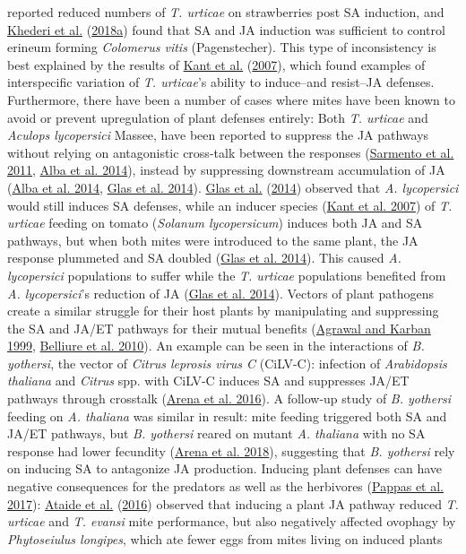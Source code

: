 \documentclass[12pt,final,CPage]{ufthesis}
\begin{document}
{reported reduced numbers of \emph{T. urticae} on strawberries post SA induction, and \protect\hyperlink{ref-Khederi2018}{Khederi et al.} (\protect\hyperlink{ref-Khederi2018}{2018a}) found that SA and JA induction was sufficient to control erineum forming \emph{Colomerus vitis} (Pagenstecher). This type of inconsistency is best explained by the results of \protect\hyperlink{ref-Kant2007}{Kant et al.} (\protect\hyperlink{ref-Kant2007}{2007}), which found examples of interspecific variation of \emph{T. urticae}'s ability to induce--and resist--JA defenses. Furthermore, there have been a number of cases where mites have been known to avoid or prevent upregulation of plant defenses entirely: Both \emph{T. urticae} and \emph{Aculops lycopersici} Massee, have been reported to suppress the JA pathways without relying on antagonistic cross-talk between the responses (\protect\hyperlink{ref-Sarmento2011}{Sarmento et al. 2011}, \protect\hyperlink{ref-Alba2014}{Alba et al. 2014}), instead by suppressing downstream accumulation of JA (\protect\hyperlink{ref-Alba2014}{Alba et al. 2014}, \protect\hyperlink{ref-Glas2014}{Glas et al. 2014}). \protect\hyperlink{ref-Glas2014}{Glas et al.} (\protect\hyperlink{ref-Glas2014}{2014}) observed that \emph{A. lycopersici} would still induces SA defenses, while an inducer species (\protect\hyperlink{ref-Kant2007}{Kant et al. 2007}) of \emph{T. urticae} feeding on tomato (\emph{Solanum lycopersicum}) induces both JA and SA pathways, but when both mites were introduced to the same plant, the JA response plummeted and SA doubled (\protect\hyperlink{ref-Glas2014}{Glas et al. 2014}). This caused \emph{A. lycopersici} populations to suffer while the \emph{T. urticae} populations benefited from \emph{A. lycopersici}'s reduction of JA (\protect\hyperlink{ref-Glas2014}{Glas et al. 2014}). Vectors of plant pathogens create a similar struggle for their host plants by manipulating and suppressing the SA and JA/ET pathways for their mutual benefits (\protect\hyperlink{ref-Agrawal1999}{Agrawal and Karban 1999}, \protect\hyperlink{ref-Belliure2010}{Belliure et al. 2010}). An example can be seen in the interactions of \emph{B. yothersi}, the vector of \emph{Citrus leprosis virus C} (CiLV-C): infection of \emph{Arabidopsis thaliana} and \emph{Citrus} spp. with CiLV-C induces SA and suppresses JA/ET pathways through crosstalk (\protect\hyperlink{ref-Arena2016}{Arena et al. 2016}). A follow-up study of \emph{B. yothersi} feeding on \emph{A. thaliana} was similar in result: mite feeding triggered both SA and JA/ET pathways, but \emph{B. yothersi} reared on mutant \emph{A. thaliana} with no SA response had lower fecundity (\protect\hyperlink{ref-Arena2018}{Arena et al. 2018}), suggesting that \emph{B. yothersi} rely on inducing SA to antagonize JA production. Inducing plant defenses can have negative consequences for the predators as well as the herbivores (\protect\hyperlink{ref-Pappas2017}{Pappas et al. 2017}): \protect\hyperlink{ref-Ataide2016}{Ataide et al.} (\protect\hyperlink{ref-Ataide2016}{2016}) observed that inducing a plant JA pathway reduced \emph{T. urticae} and \emph{T. evansi} mite performance, but also negatively affected ovophagy by \emph{Phytoseiulus longipes}, which ate fewer eggs from mites living on induced plants }
\end{document}
